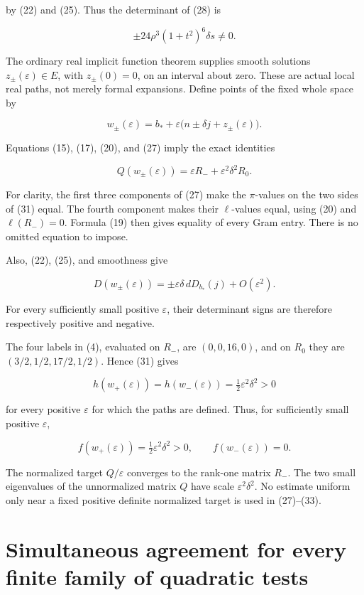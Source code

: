 \documentclass[11pt]{article}
\begin{document}
by (22) and (25). Thus the determinant of (28) is

\[
\pm24\rho^3(1+t^2)^6\delta s\ne0.
\tag{29}
\]

The ordinary real implicit function theorem supplies smooth solutions
\(z_\pm(\varepsilon)\in E\), with \(z_\pm(0)=0\), on an interval about
zero. These are actual local real paths, not merely formal expansions.
Define points of the fixed whole space by

\[
w_\pm(\varepsilon)=b_*+
\varepsilon\bigl(n\pm\delta j+z_\pm(\varepsilon)\bigr).
\tag{30}
\]

Equations (15), (17), (20), and (27) imply the exact identities

\[
Q(w_\pm(\varepsilon))
 =\varepsilon R_-+\varepsilon^2\delta^2R_0.
\tag{31}
\]

For clarity, the first three components of (27) make the \(\pi\)-values on
the two sides of (31) equal. The fourth component makes their \(\ell\)-values
equal, using (20) and \(\ell(R_-)=0\). Formula (19) then gives equality of
every Gram entry. There is no omitted equation to impose.

Also, (22), (25), and smoothness give

\[
D(w_\pm(\varepsilon))
 =\pm\varepsilon\delta\,dD_{b_*}(j)+O(\varepsilon^2).
\tag{32}
\]

For every sufficiently small positive \(\varepsilon\), their determinant
signs are therefore respectively positive and negative.

The four labels in (4), evaluated on \(R_-\), are \((0,0,16,0)\), and on
\(R_0\) they are \((3/2,1/2,17/2,1/2)\). Hence (31) gives

\[
h(w_+(\varepsilon))=h(w_-(\varepsilon))
  =\tfrac12\varepsilon^2\delta^2>0
\]

for every positive \(\varepsilon\) for which the paths are defined. Thus,
for sufficiently small positive \(\varepsilon\),

\[
f(w_+(\varepsilon))=\tfrac12\varepsilon^2\delta^2>0,
\qquad f(w_-(\varepsilon))=0.
\tag{33}
\]

The normalized target \(Q/\varepsilon\) converges to the rank-one matrix
\(R_-\). The two small eigenvalues of the unnormalized matrix \(Q\) have scale
\(\varepsilon^2\delta^2\). No estimate uniform only near a fixed positive
definite normalized target is used in (27)--(33).

\section{Simultaneous agreement for every finite family of quadratic tests}
\end{document}
